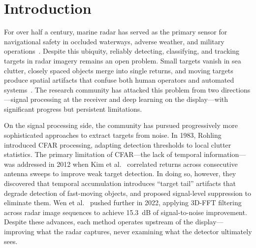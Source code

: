 \documentclass[colorlinks,upint,balance]{asmeconf}
\begin{document}
\begin{abstract}
Echo trails---the persistence of radar returns across successive PPI scans---appear on every marine radar display, yet their effect on deep learning detectors has never been studied. This paper presents a systematic ablation study of how trail length, decay function, intensity encoding, color mapping, target range, clutter level, target proximity, and trajectory crossing influence YOLOv8 detection performance on simulated X-Band marine radar imagery. Results reveal that trail parameters substantially affect detection accuracy, that optimal trail length depends on both target range and speed, and that crossing trajectories produce overlap artifacts that degrade multi-target resolution. These findings motivate range-adaptive trail rendering as a design principle for machine-learning-driven maritime perception.
\end{abstract}


\section{Introduction}

For over half a century, marine radar has served as the primary sensor for navigational safety in occluded waterways, adverse weather, and military operations~\cite{Skolnik2001Radar}. Despite this ubiquity, reliably detecting, classifying, and tracking targets in radar imagery remains an open problem. Small targets vanish in sea clutter, closely spaced objects merge into single returns, and moving targets produce spatial artifacts that confuse both human operators and automated systems~\cite{Ward2013Marine, Chen2022VisibilityGraph}. The research community has attacked this problem from two directions---signal processing at the receiver and deep learning on the display---with significant progress but persistent limitations.

On the signal processing side, the community has pursued progressively more sophisticated approaches to extract targets from noise. In 1983, Rohling~\cite{Rohling1983CFAR} introduced CFAR processing, adapting detection thresholds to local clutter statistics. The primary limitation of CFAR---the lack of temporal information---was addressed in 2012 when Kim et al.~\cite{Kim2012ScanCorrelation} correlated returns across consecutive antenna sweeps to improve weak target detection. In doing so, however, they discovered that temporal accumulation introduces ``target tail'' artifacts that degrade detection of fast-moving objects, and proposed signal-level suppression to eliminate them. Wen et al.~\cite{Wen2022SpatioTemporal} pushed further in 2022, applying 3D-FFT filtering across radar image sequences to achieve 15.3~dB of signal-to-noise improvement. Despite these advances, each method operates upstream of the display---improving what the radar captures, never examining what the detector ultimately sees.
\end{document}
